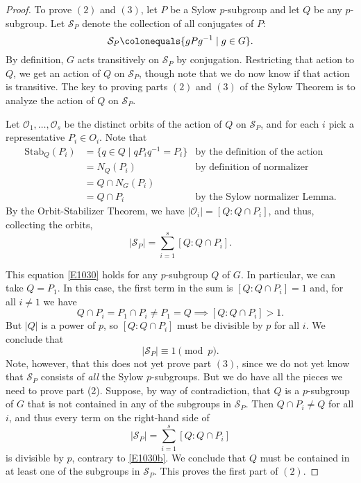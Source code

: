 \documentclass[12pt]{report}
\numberwithin{equation}{section}
\numberwithin{theorem}{chapter}
\theoremstyle{definition}
\newtheorem*{basic properties}{Basic Properties}
\newtheorem*{Important Remark}{Important Remark}
\newcommand{\cS}{\mathcal{S}}
\begin{document}
\begin{proof}
To prove $(2)$ and $(3)$, let $P$ be a Sylow $p$-subgroup and let $Q$ be any $p$-subgroup. 
Let $\mathcal{S}_P$ denote the collection of all conjugates of $P$: 
$$\cS_P \colonequals \{ gPg^{-1} \mid g \in G\}.$$
By definition, $G$ acts transitively on $\cS_P$ by conjugation. Restricting that action to $Q$, we get an action of $Q$ on $\cS_P$, though note that we do now know if that action is transitive. 
The key to proving parts $(2)$ and $(3)$ of the Sylow Theorem is to analyze the action of $Q$ on $\cS_P$.

Let $\mathcal{O}_1, \dots, \mathcal{O}_s$ be the distinct orbits of the action of $Q$ on $\cS_P$, and for each $i$ pick a representative $P_i \in O_i$. Note that 
$$\begin{aligned}
\mathrm{Stab}_Q(P_i) & = \{q \in Q \mid qP_iq^{-1} = P_i\} & \textrm{by the definition of the action}\\
& = N_Q(P_i) & \textrm{by definition of normalizer}\\
& = Q \cap N_G(P_i) &  \\
& = Q \cap P_i & \text{by the Sylow normalizer Lemma}.	
\end{aligned}$$ 
By the Orbit-Stabilizer Theorem, we have $|\mathcal{O}_i| = [Q: Q \cap P_i]$, and thus, collecting the orbits,
\begin{equation} \label{E1030}
|\cS_P |= \sum_{i=1}^s [Q: Q \cap P_i].
\end{equation}

This equation \ref{E1030} holds for any $p$-subgroup $Q$ of $G$. In particular, we can take $Q = P_1$. In this case, the first term in the sum is $[Q: Q \cap P_i] = 1$ and, for all $i \neq 1$ we have
$$Q \cap P_i = P_1 \cap P_i \neq P_1 = Q \implies [Q: Q \cap P_i] > 1.$$ 
But $|Q|$ is a power of $p$, so $[Q: Q \cap P_i]$ must be divisible by $p$ for all $i$. We conclude that
\begin{equation} \label{E1030b}
|\cS_P| \equiv 1 \pmod{p}.
\end{equation}
Note, however, that this does not yet prove part $(3)$, since we do not yet know that $\cS_P$ consists of \emph{all} the Sylow $p$-subgroups.
But we do have all the pieces we need to prove part (2). Suppose, by way of contradiction, that $Q$ is a $p$-subgroup of $G$ that is not contained in any of the subgroups in $\cS_P$. Then $Q \cap P_i \neq Q$ for all $i$, and thus every term on the right-hand side of 
$$|\cS_P |= \sum_{i=1}^s [Q: Q \cap P_i]$$
is divisible by $p$, contrary to \eqref{E1030b}. We conclude that $Q$ must be contained in at least one of the subgroups in $\cS_P$. This proves the first part of $(2)$. 


\end{proof}
\end{document}
